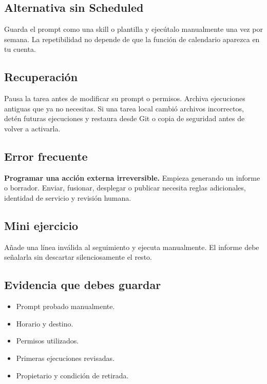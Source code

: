 \documentclass[10pt,a4paper,openany]{book}
\providecommand{\tightlist}{\setlength{\itemsep}{0.18em}\setlength{\parskip}{0pt}}
\begin{document}
\subsection{Alternativa sin Scheduled}\label{alternativa-sin-scheduled}

Guarda el prompt como una skill o plantilla y ejecútalo manualmente una
vez por semana. La repetibilidad no depende de que la función de
calendario aparezca en tu cuenta.

\subsection{Recuperación}\label{recuperaciuxf3n-15}

Pausa la tarea antes de modificar su prompt o permisos. Archiva
ejecuciones antiguas que ya no necesitas. Si una tarea local cambió
archivos incorrectos, detén futuras ejecuciones y restaura desde Git o
copia de seguridad antes de volver a activarla.

\subsection{Error frecuente}\label{error-frecuente-17}

\textbf{Programar una acción externa irreversible.} Empieza generando un
informe o borrador. Enviar, fusionar, desplegar o publicar necesita
reglas adicionales, identidad de servicio y revisión humana.

\subsection{Mini ejercicio}\label{mini-ejercicio-13}

Añade una línea inválida al seguimiento y ejecuta manualmente. El
informe debe señalarla sin descartar silenciosamente el resto.

\subsection{Evidencia que debes
guardar}\label{evidencia-que-debes-guardar-17}

\begin{itemize}
\tightlist
\item
  Prompt probado manualmente.
\item
  Horario y destino.
\item
  Permisos utilizados.
\item
  Primeras ejecuciones revisadas.
\item
  Propietario y condición de retirada.
\end{itemize}
\end{document}
